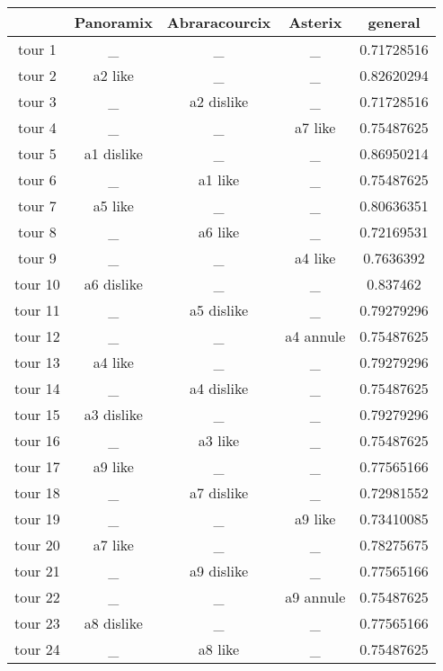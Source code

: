 \documentclass{article}
\begin{document}
\begin{tabular}{|c|c|c|c|c|}
\hline
& Panoramix & Abraracourcix & Asterix & general \\
\hline
tour 1 & \_ & \_ & \_ & 0.71728516 \\
\hline
tour 2 & a2 like & \_ & \_ & 0.82620294 \\
\hline
tour 3 & \_ & a2 dislike & \_ & 0.71728516 \\
\hline
tour 4 & \_ & \_ & a7 like & 0.75487625 \\
\hline
tour 5 & a1 dislike & \_ & \_ & 0.86950214 \\
\hline
tour 6 & \_ & a1 like & \_ & 0.75487625 \\
\hline
tour 7 & a5 like & \_ & \_ & 0.80636351 \\
\hline
tour 8 & \_ & a6 like & \_ & 0.72169531 \\
\hline
tour 9 & \_ & \_ & a4 like & 0.7636392 \\
\hline
tour 10 & a6 dislike & \_ & \_ & 0.837462 \\
\hline
tour 11 & \_ & a5 dislike & \_ & 0.79279296 \\
\hline
tour 12 & \_ & \_ & a4 annule & 0.75487625 \\
\hline
tour 13 & a4 like & \_ & \_ & 0.79279296 \\
\hline
tour 14 & \_ & a4 dislike & \_ & 0.75487625 \\
\hline
tour 15 & a3 dislike & \_ & \_ & 0.79279296 \\
\hline
tour 16 & \_ & a3 like & \_ & 0.75487625 \\
\hline
tour 17 & a9 like & \_ & \_ & 0.77565166 \\
\hline
tour 18 & \_ & a7 dislike & \_ & 0.72981552 \\
\hline
tour 19 & \_ & \_ & a9 like & 0.73410085 \\
\hline
tour 20 & a7 like & \_ & \_ & 0.78275675 \\
\hline
tour 21 & \_ & a9 dislike & \_ & 0.77565166 \\
\hline
tour 22 & \_ & \_ & a9 annule & 0.75487625 \\
\hline
tour 23 & a8 dislike & \_ & \_ & 0.77565166 \\
\hline
tour 24 & \_ & a8 like & \_ & 0.75487625 \\
\hline
\end{tabular}
\end{document}
